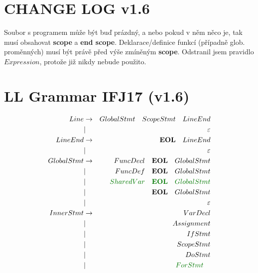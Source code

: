 \documentclass[a4paper,11pt,landscape,leqno]{article}
\begin{document}
\section{CHANGE LOG v1.6}
Soubor s programem může být buď prázdný, a nebo pokud v něm něco je, tak musí obsahovat \textbf{scope} a \textbf{end scope}. Deklarace/definice funkcí (případně glob. proměnných) musí být právě před výše zmíněným \textbf{scope}.
Odstranil jsem pravidlo $Expression$, protože již nikdy nebude použito.
\section{LL Grammar IFJ17 (v1.6)}
\begin{eqnarray}
Line        &   \rightarrow     & GlobalStmt\quad ScopeStmt\quad  LineEnd    \\
            &       |           & \varepsilon         \\
LineEnd     & \rightarrow       & \textbf{EOL}\quad LineEnd\\
            &       |           & \varepsilon         \\
GlobalStmt  &   \rightarrow     &  FuncDecl\quad \textbf{EOL}\quad GlobalStmt    \\
            &       |           & FuncDef\quad \textbf{EOL}\quad GlobalStmt    \\
            &       |           & \textcolor{green1}{SharedVar\quad \textbf{EOL}\quad GlobalStmt}    \\
            &       |           & \textbf{EOL}\quad GlobalStmt\\
            &       |           & \varepsilon \\
InnerStmt   &   \rightarrow     & VarDecl  \\
            &       |           & Assignment    \\
            &       |           & IfStmt    \\
            &       |           & ScopeStmt   \\
            &       |           & DoStmt  \\
            &       |           & \textcolor{green1}{ForStmt}\quad  \\

\end{eqnarray}
\end{document}
